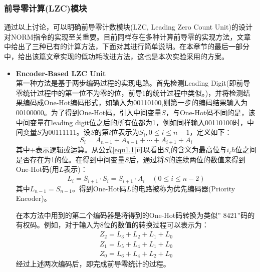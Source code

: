 \subsubsection{前导零计算(LZC)模块}
通过以上讨论，可以明确前导零计数模块(LZC, Leading Zero Count Unit)的设计对NORM指令的实现至关重要。目前同样存在多种计算前导零的实现方法，文章\cite{dimitrakopoulos2008low}中给出了三种已有的计算方法，下面对其进行简单说明。在本章节的最后一部分中，给出该篇文章实现的低功耗改进方法，这也是本次实验采用的方案。
\begin{itemize}
\item \textbf{Encoder-Based LZC Unit}\\
第一种方法是基于两步编码过程的实现电路。首先检测Leading Digit(即前导零统计过程中的第一位不为零的位，前导1的统计过程中类似。)，并将检测结果编码成One-Hot编码形式，如输入为00110100,则第一步的编码结果输入为00100000。为了得到One-Hot码，引入中间变量$S$，与One-Hot码不同的是，该中间变量在leading digit位之后的所有位都为1，例如同样输入00110100时，中间变量$S$为00111111。设$S$的第$i$位表示为$S_i, 0 \le i \le n-1 $，定义如下：
\begin{equation}\label{equ1.1}
S_i = A_{n-1} + A_{n-1} + \cdots + A_{i+1} + A_i
\end{equation}
其中$+$表示逻辑或运算。从公式\ref{equ1.1}可以看出$S_i$的含义为最高位与$i_th$位之间是否存在为1的位。在得到中间变量$S$后，通过将$S$的连续两位的数值来得到One-Hot码(用$L$表示)：
\begin{equation}\label{equ1.2}
L_i = \overline{S}_{i + 1} \cdot S_i = \overline{S}_{i + 1} \cdot A_i \quad (0 \le i \le n-2)
\end{equation} 
其中$L_{n-1} = S_{n-1}$。得到One-Hot码$L$的电路被称为优先编码器(Priority Encoder)。

在本方法中用到的第二个编码器是将得到的One-Hot码转换为类似'' 8421''码的有权码。例如，对于输入为8位的数值的转换过程可以表示为：
\begin{equation}
\label{equ1.3}
\begin{gathered}
Z_2 = L_3 + L_2 + L_1 + L_0\\
Z_1 = L_5 + L_4 + L_1 + L_0 \\
Z_0 = L_6 + L_4 + L_2 + L_0
\end{gathered}
\end{equation}
经过上述两次编码后，即完成前导零统计的过程。


\end{itemize}
